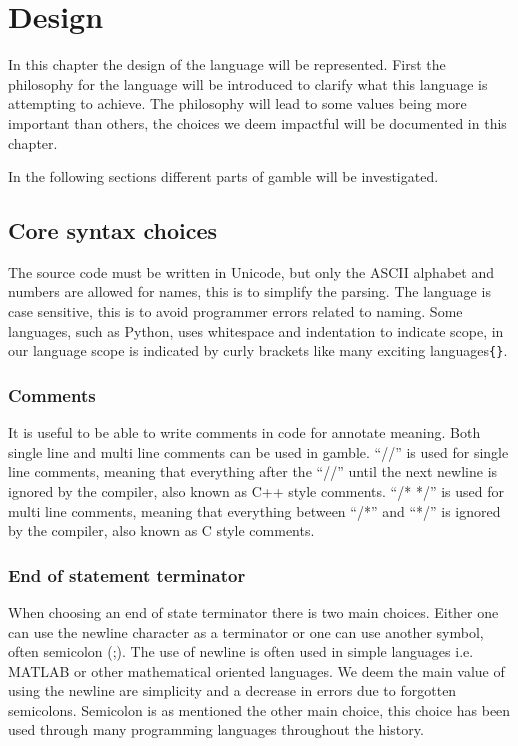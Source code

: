 \chapter{Design}
\label{cha:Design}
In this chapter the design of the language will be represented.
First the philosophy for the language will be introduced to clarify what this language is attempting to achieve.
The philosophy will lead to some values being more important than others, the choices we deem impactful will be documented in this chapter.



In the following sections different parts of \gls{gamble} will be investigated.

\section{Core syntax choices}

The source code must be written in Unicode, but only the ASCII alphabet and numbers are allowed for names, this is to simplify the parsing. 
The language is case sensitive, this is to avoid programmer errors related to naming. 
Some languages, such as Python, uses whitespace and indentation to indicate scope, in our language scope is indicated by curly brackets like many exciting languages\texttt{\{\}}.  

\subsection*{Comments}
It is useful to be able to write comments in code for annotate meaning.
Both single line and multi line comments can be used in \gls{gamble}. 
``//'' is used for single line comments, meaning that everything after the ``//'' until the next newline is ignored by the compiler, also known as C++ style comments. 
``/* */'' is used for multi line comments, meaning that everything between ``/*'' and ``*/'' is ignored by the compiler, also known as C style comments. 

\subsection*{End of statement terminator}
When choosing an end of state terminator there is two main choices.
Either one can use the newline character as a terminator or one can use another symbol, often semicolon (;).
The use of newline is often used in simple languages i.e. MATLAB or other mathematical oriented languages. 
We deem the main value of using the newline are simplicity and a decrease in errors due to forgotten semicolons.
Semicolon is as mentioned the other main choice, this choice has been used through many programming languages throughout the history. 


